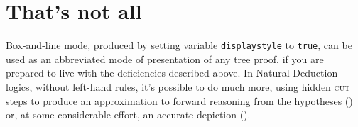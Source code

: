 \section{That's not all}

Box-and-line mode, produced by setting variable \texttt{displaystyle} to \texttt{true}, can be used as an abbreviated mode of presentation of any tree proof, if you are prepared to live with the deficiencies described above. In Natural Deduction logics, without left-hand rules, it's possible to do much more, using hidden \textsc{cut} steps to produce an approximation to forward reasoning from the hypotheses () or, at some considerable effort, an accurate depiction ().
